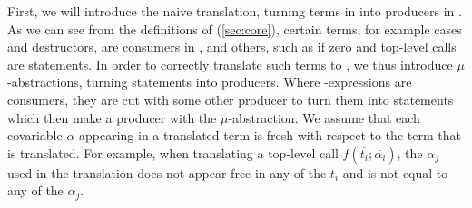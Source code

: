 First, we will introduce the naive translation, turning terms in \surfacelang{} into producers in \targetlang{}. 
As we can see from the definitions of \targetlang{} (\cref{sec:core}), certain terms, for example cases and destructors, are consumers in \targetlang{}, and others, such as if zero and top-level calls are statements.
In order to correctly translate such terms to \targetlang{}, we thus introduce $\mu$-abstractions, turning statements into producers.
Where \targetlang{}-expressions are consumers, they are cut with some other producer to turn them into statements which then make a producer with the $\mu$-abstraction.
We assume that each covariable $\alpha$ appearing in a translated term is fresh with respect to the term that is translated.
For example, when translating a top-level call $f(\overline{t_i};\overline{\alpha_i})$, the $\alpha_j$ used in the translation does not appear free in any of the $t_i$ and is not equal to any of the $\alpha_j$.
